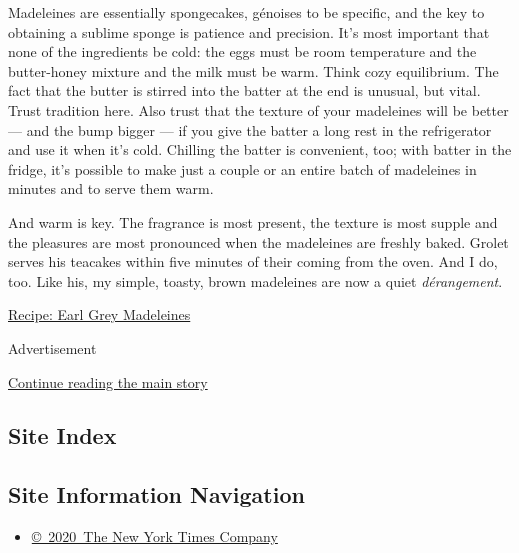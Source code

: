 Madeleines are essentially spongecakes, génoises to be specific, and the
key to obtaining a sublime sponge is patience and precision. It's most
important that none of the ingredients be cold: the eggs must be room
temperature and the butter-honey mixture and the milk must be warm.
Think cozy equilibrium. The fact that the butter is stirred into the
batter at the end is unusual, but vital. Trust tradition here. Also
trust that the texture of your madeleines will be better --- and the
bump bigger --- if you give the batter a long rest in the refrigerator
and use it when it's cold. Chilling the batter is convenient, too; with
batter in the fridge, it's possible to make just a couple or an entire
batch of madeleines in minutes and to serve them warm.

And warm is key. The fragrance is most present, the texture is most
supple and the pleasures are most pronounced when the madeleines are
freshly baked. Grolet serves his teacakes within five minutes of their
coming from the oven. And I do, too. Like his, my simple, toasty, brown
madeleines are now a quiet \emph{dérangement}.

\href{https://cooking.nytimes3xbfgragh.onion/recipes/1020684-earl-grey-madeleines}{Recipe:
Earl Grey Madeleines}

Advertisement

\protect\hyperlink{after-bottom}{Continue reading the main story}

\hypertarget{site-index}{%
\subsection{Site Index}\label{site-index}}

\hypertarget{site-information-navigation}{%
\subsection{Site Information
Navigation}\label{site-information-navigation}}

\begin{itemize}
\tightlist
\item
  \href{https://help.nytimes3xbfgragh.onion/hc/en-us/articles/115014792127-Copyright-notice}{©~2020~The
  New York Times Company}
\end{itemize}

